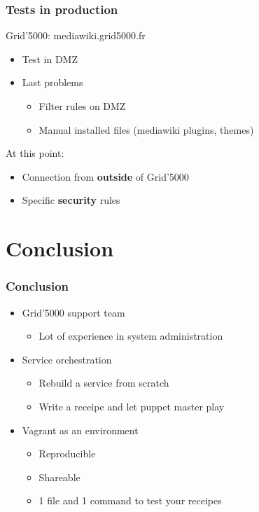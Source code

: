 \documentclass[11pt,compress]{beamer}
\begin{document}
\begin{frame}
\frametitle{Tests in production}
\begin{block}{Grid'5000: mediawiki.grid5000.fr}
\begin{itemize}
\item Test in DMZ
\item Last problems
\begin{itemize}
\item Filter rules on DMZ
\item Manual installed files (mediawiki plugins, themes)
\end{itemize}
\end{itemize}
\end{block}
At this point:
\begin{itemize}
\item Connection from \textbf{outside} of Grid'5000
\item Specific \textbf{security} rules
\end{itemize}
\end{frame}

\section{Conclusion}
\begin{frame}
\frametitle{Conclusion}
\begin{itemize}
\item Grid'5000 support team
\begin{itemize}
\item Lot of experience in system administration
\end{itemize}
\item Service orchestration
\begin{itemize}
\item Rebuild a service from scratch
\item Write a receipe and let puppet master play
\end{itemize}
\item Vagrant as an environment
\begin{itemize}
\item Reproducible
\item Shareable
\item 1 file and 1 command to test your receipes
\end{itemize}
\end{itemize}
\end{frame}
\end{document}
